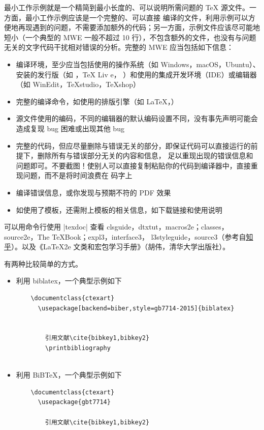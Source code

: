 最小工作示例就是一个精简到最小长度的、可以说明所需问题的 \TeX{} 源文件。一方面，最小工作示例应该是一个完整的、可以直接
编译的文件，利用示例可以方便地再现遇到的问题，不需要添加额外的代码；另一方面，示例文件应该尽可能地短小（一个典型的 MWE
一般不超过 10 行），不包含额外的文件，也没有与问题无关的文字代码干扰相对错误的分析。完整的 MWE 应当包括如下信息：
\begin{itemize}
  \item 编译环境，至少应当包括使用的操作系统（如 Windows，macOS，Ubuntu）、安装的发行版（如 \CTeX{}，\TeX{} Liv
  e，\MacTeX{} ）和使用的集成开发环境（IDE）或编辑器（如 WinEdit，TeXstudio，TeXshop）
  \item 完整的编译命令，如使用的排版引擎（如 \LaTeX{}，\XeLaTeX{}）
  \item 源文件使用的编码，不同的编辑器的默认编码设置不同，没有事先声明可能会造成复现 bug 困难或出现其他 bug
  \item 完整的代码，但应尽量删除与错误无关的部分，即保证代码可以直接运行的前提下，删除所有与错误部分无关的内容和信息，
  足以重现出现的错误信息和问题即可。不要截图！使别人可以直接复制粘贴你的代码到编译器中，直接重现问题，而不是将时间浪费在
  码字上
  \item 编译错误信息，或你发现与预期不符的 PDF 效果
  \item 如使用了模板，还需附上模板的相关信息，如下载链接和使用说明
\end{itemize}



可以用命令行使用 |texdoc| 查看 clsguide，dtxtut，macros2e；classes，source2e，The TeXBook；expl3，interface3，
l3styleguide，source3（参考自\href{https://www.zhihu.com/question/27017364}{知乎}）。以及《\LaTeX{2e}
文类和宏包学习手册》（胡伟，清华大学出版社）。









有两种比较简单的方式。
\begin{itemize}
  \item 利用 biblatex，一个典型示例如下
  \begin{verbatim}
    \documentclass{ctexart}
      \usepackage[backend=biber,style=gb7714-2015]{biblatex}
      
      
        引用文献\cite{bibkey1,bibkey2}
        \printbibliography
      
    \end{verbatim}
  \item 利用 BiB\TeX，一个典型示例如下
  \begin{verbatim}
    \documentclass{ctexart}
      \usepackage{gbt7714}
      
        引用文献\cite{bibkey1,bibkey2}
        
      
  \end{verbatim}
\end{itemize}


